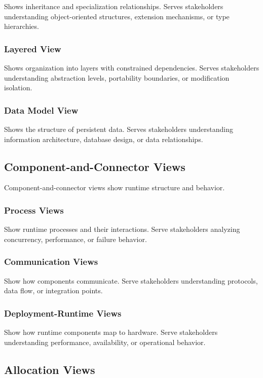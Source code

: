 \documentclass[11pt]{article}
\begin{document}
Shows inheritance and specialization relationships. Serves stakeholders understanding object-oriented structures, extension mechanisms, or type hierarchies.

\subsubsection{Layered View}

Shows organization into layers with constrained dependencies. Serves stakeholders understanding abstraction levels, portability boundaries, or modification isolation.

\subsubsection{Data Model View}

Shows the structure of persistent data. Serves stakeholders understanding information architecture, database design, or data relationships.

\subsection{Component-and-Connector Views}

Component-and-connector views show runtime structure and behavior.

\subsubsection{Process Views}

Show runtime processes and their interactions. Serve stakeholders analyzing concurrency, performance, or failure behavior.

\subsubsection{Communication Views}

Show how components communicate. Serve stakeholders understanding protocols, data flow, or integration points.

\subsubsection{Deployment-Runtime Views}

Show how runtime components map to hardware. Serve stakeholders understanding performance, availability, or operational behavior.

\subsection{Allocation Views}
\end{document}
